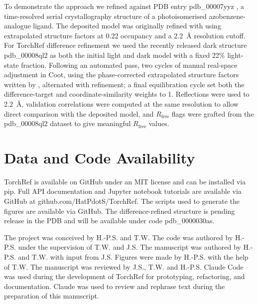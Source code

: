 \documentclass{iucrjournals}
\begin{document}
To demonstrate the approach we refined against PDB entry pdb\_00007yyz
\cite{wranik_watching_2023}, a time-resolved serial crystallography structure of
a photoisomerised azobenzene-analogue ligand.  The deposited model was originally
refined with  using extrapolated structure factors at 0.22 occupancy and a
2.2~\AA{} resolution cutoff.  For TorchRef difference refinement we used the
recently released dark structure pdb\_00008ql2 as both the initial light and
dark model with a fixed 22\% light-state fraction.  Following an automated
pass, two cycles of manual real-space adjustment in Coot, using the
phase-corrected extrapolated structure factors written by
, alternated with refinement; a final
equilibration cycle set both the difference-target and coordinate-similarity
weights to 1.  Reflections were used to 2.2~\AA{}, validation correlations were
computed at the same resolution to allow direct comparison with the deposited
model, and $R_\mathrm{free}$ flags were grafted from the pdb\_00008ql2 dataset
to give meaningful $R_\mathrm{free}$ values.


\section{Data and Code Availability}

TorchRef is available on GitHub under an MIT license and can be installed via
pip.
Full API documentation and Jupyter notebook tutorials are available via GitHub
at github.com/HatPdotS/TorchRef.
The scripts used to generate the figures are available via GitHub.
The difference-refined structure is pending release in the PDB and will be
available under code pdb\_0000030as.



\begin{acknowledgements}
The project was conceived by H.-P.S. and T.W.
The code was authored by H.-P.S. under the supervision of T.W. and J.S.
The manuscript was authored by H.-P.S. and T.W. with input from J.S.
Figures were made by H.-P.S. with the help of T.W.
The manuscript was reviewed by J.S., T.W. and H.-P.S.
Claude Code was used during the development of TorchRef for
prototyping, refactoring, and documentation.
Claude was used to review and rephrase text during the preparation of this
manuscript.
\end{acknowledgements}
\end{document}
